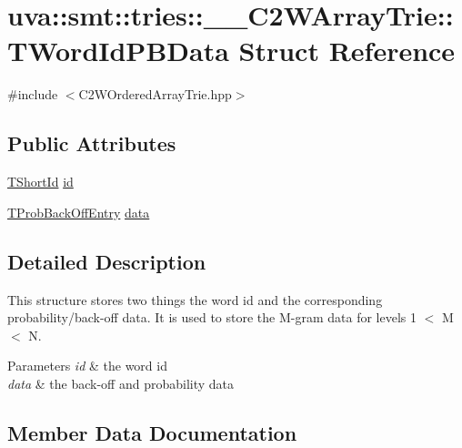 \hypertarget{structuva_1_1smt_1_1tries_1_1_____c2_w_array_trie_1_1_t_word_id_p_b_data}{}\section{uva\+:\+:smt\+:\+:tries\+:\+:\+\_\+\+\_\+\+C2\+W\+Array\+Trie\+:\+:T\+Word\+Id\+P\+B\+Data Struct Reference}
\label{structuva_1_1smt_1_1tries_1_1_____c2_w_array_trie_1_1_t_word_id_p_b_data}


{\ttfamily \#include $<$C2\+W\+Ordered\+Array\+Trie.\+hpp$>$}

\subsection*{Public Attributes}
\begin{DoxyCompactItemize}
\item 
\hyperlink{namespaceuva_1_1smt_1_1hashing_adcf22e1982ad09d3a63494c006267469}{T\+Short\+Id} \hyperlink{structuva_1_1smt_1_1tries_1_1_____c2_w_array_trie_1_1_t_word_id_p_b_data_a9ce49ee80d214c454766b205990e1c77}{id}
\item 
\hyperlink{structuva_1_1smt_1_1tries_1_1_t_prob_back_off_entry}{T\+Prob\+Back\+Off\+Entry} \hyperlink{structuva_1_1smt_1_1tries_1_1_____c2_w_array_trie_1_1_t_word_id_p_b_data_a2c33cf0434b38201eb14a595de99d9a1}{data}
\end{DoxyCompactItemize}


\subsection{Detailed Description}
This structure stores two things the word id and the corresponding probability/back-\/off data. It is used to store the M-\/gram data for levels 1 $<$ M $<$ N. 
\begin{DoxyParams}{Parameters}
{\em id} & the word id \\
\hline
{\em data} & the back-\/off and probability data \\
\hline
\end{DoxyParams}


\subsection{Member Data Documentation}
\hypertarget{structuva_1_1smt_1_1tries_1_1_____c2_w_array_trie_1_1_t_word_id_p_b_data_a2c33cf0434b38201eb14a595de99d9a1}{}

